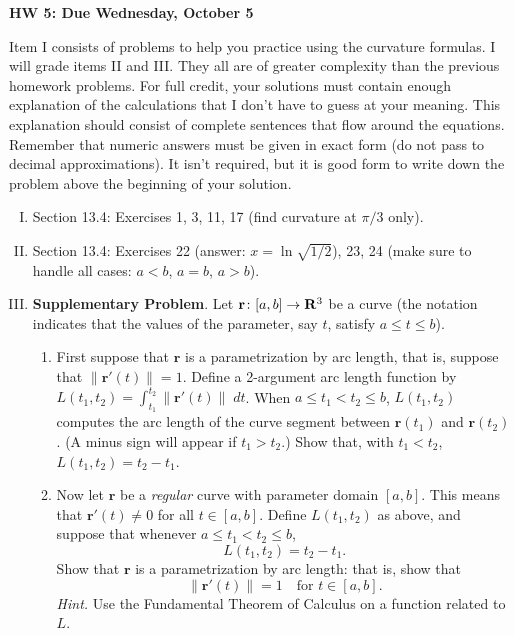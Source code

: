 \documentclass[10pt]{amsart}
\begin{document}
\begin{center}
\textbf{HW 5: Due Wednesday, October 5}
\end{center}
     Item I consists of problems to help you practice using the curvature formulas. I will grade items II and III. They all are of greater complexity than the previous homework problems. For full credit, your solutions must contain enough explanation of the calculations that I don't have to guess at your meaning. This explanation should consist of complete sentences that flow around the equations. Remember that numeric answers must be given in exact form (do not pass to decimal approximations). It isn't required, but it is good form to write down the problem above the beginning of your solution.
\begin{enumerate}[I.]
    \item Section 13.4: Exercises 1, 3, 11, 17 (find curvature at $\pi/3$ only).
    \item Section 13.4: Exercises 22 (answer: $x = \ln \sqrt{1/2}$), 23, 24 (make sure to handle all cases: $a < b$, $a = b$, $a > b$).
    \item \textbf{Supplementary Problem}. Let $\mathbf{r} \colon [a,b] \to \mathbf R^3$ be a curve (the notation indicates that the values of the parameter, say $t$, satisfy $a \leq t \leq b$).
        \begin{enumerate}
           \item First suppose that $\mathbf{r}$ is a parametrization by arc length, that is, suppose that $\|\mathbf{r}'(t)\| = 1$. Define a 2-argument arc length function by $L(t_1, t_2) = \int_{t_1}^{t_2} \|\mathbf{r}'(t)\| \; dt$. When $a \leq t_1 < t_2 \leq b$, $L(t_1,t_2)$ computes the arc length of the curve segment between $\mathbf{r}(t_1)$ and $\mathbf{r}(t_2)$. (A minus sign will appear if $t_1 > t_2$.) Show that, with $t_1 < t_2$, $L(t_1, t_2) = t_2 - t_1$.
           \item Now let $\mathbf{r}$ be a \emph{regular} curve with parameter domain $[a,b]$. This means that $\mathbf{r}'(t) \ne 0$ for all $t \in [a,b]$. Define $L(t_1,t_2)$ as above, and suppose that whenever $a \leq t_1 < t_2 \leq b$,
               \[ L(t_1,t_2) = t_2 - t_1. \]
               Show that $\mathbf{r}$ is a parametrization by arc length: that is, show that
               \[ \| \mathbf{r}'(t) \| = 1 \quad \text{for $t \in [a,b]$.} \]
               \emph{Hint.} Use the Fundamental Theorem of Calculus on a function related to $L$.
        \end{enumerate}
\end{enumerate}
\end{document}
